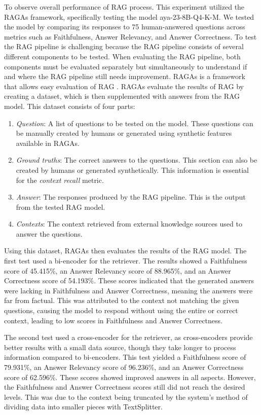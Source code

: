 To observe overall performance of RAG process. This experiment utilized the RAGAs framework, specifically testing the model aya-23-8B-Q4-K-M. We tested the model by comparing its responses to 75 human-answered questions across metrics such as Faithfulness, Answer Relevancy, and Answer Correctness.
To test the RAG pipeline is challenging because the RAG pipeline consists of several different components to be tested. When evaluating the RAG pipeline, both components must be evaluated separately but simultaneously to understand if and where the RAG pipeline still needs improvement. RAGAs is a framework that allows easy evaluation of RAG \cite{es2023ragas}. RAGAs evaluate the results of RAG by creating a dataset, which is then supplemented with answers from the RAG model. This dataset consists of four parts:

\begin{enumerate}[nolistsep]
\item \emph{Question}: A list of questions to be tested on the model. These questions can be manually created by humans or generated using synthetic features available in RAGAs.
\item \emph{Ground truths}: The correct answers to the questions. This section can also be created by humans or generated synthetically. This information is essential for the \emph{context recall} metric.
\item \emph{Answer}: The responses produced by the RAG pipeline. This is the output from the tested RAG model.
\item \emph{Contexts}: The context retrieved from external knowledge sources used to answer the questions.
\end{enumerate}

Using this dataset, RAGAs then evaluates the results of the RAG model.
The first test used a bi-encoder for the retriever. The results showed a Faithfulness score of 45.415\%, an Answer Relevancy score of 88.965\%, and an Answer Correctness score of 54.193\%. These scores indicated that the generated answers were lacking in Faithfulness and Answer Correctness, meaning the answers were far from factual. This was attributed to the context not matching the given questions, causing the model to respond without using the entire or correct context, leading to low scores in Faithfulness and Answer Correctness.

The second test used a cross-encoder for the retriever, as cross-encoders provide better results with a small data source, though they take longer to process information compared to bi-encoders. This test yielded a Faithfulness score of 79.931\%, an Answer Relevancy score of 96.236\%, and an Answer Correctness score of 62.596\%. These scores showed improved answers in all aspects. However, the Faithfulness and Answer Correctness scores still did not reach the desired levels. This was due to the context being truncated by the system's method of dividing data into smaller pieces with TextSplitter.


